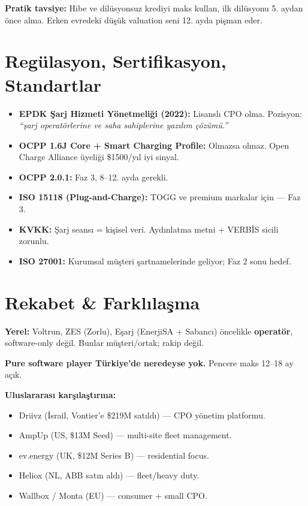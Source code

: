 \documentclass[11pt,a4paper]{article}
\begin{document}
\textbf{Pratik tavsiye:} Hibe ve dilüsyonsuz krediyi maks kullan, ilk dilüsyonu 5. aydan önce alma. Erken evredeki düşük valuation seni 12. ayda pişman eder.

\section{Regülasyon, Sertifikasyon, Standartlar}

\begin{itemize}
    \item \textbf{EPDK Şarj Hizmeti Yönetmeliği (2022):} Lisanslı CPO olma. Pozisyon: \textit{``şarj operatörlerine ve saha sahiplerine yazılım çözümü.''}
    \item \textbf{OCPP 1.6J Core + Smart Charging Profile:} Olmazsa olmaz. Open Charge Alliance üyeliği \$1500/yıl iyi sinyal.
    \item \textbf{OCPP 2.0.1:} Faz 3, 8--12. ayda gerekli.
    \item \textbf{ISO 15118 (Plug-and-Charge):} TOGG ve premium markalar için --- Faz 3.
    \item \textbf{KVKK:} Şarj seansı = kişisel veri. Aydınlatma metni + VERBİS sicili zorunlu.
    \item \textbf{ISO 27001:} Kurumsal müşteri şartnamelerinde geliyor; Faz 2 sonu hedef.
\end{itemize}

\section{Rekabet \& Farklılaşma}

\textbf{Yerel:} Voltrun, ZES (Zorlu), Eşarj (EnerjiSA + Sabancı) öncelikle \textbf{operatör}, software-only değil. Bunlar müşteri/ortak; rakip değil.

\textbf{Pure software player Türkiye'de neredeyse yok.} Pencere maks 12--18 ay açık.

\textbf{Uluslararası karşılaştırma:}
\begin{itemize}
    \item Driivz (İsrail, Vontier'e \$219M satıldı) --- CPO yönetim platformu.
    \item AmpUp (US, \$13M Seed) --- multi-site fleet management.
    \item ev.energy (UK, \$12M Series B) --- residential focus.
    \item Heliox (NL, ABB satın aldı) --- fleet/heavy duty.
    \item Wallbox / Monta (EU) --- consumer + small CPO.
\end{itemize}
\end{document}
